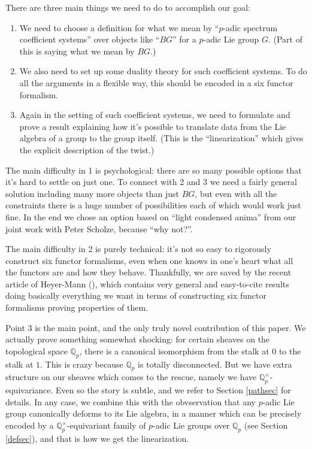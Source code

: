 \documentclass[12pt]{article}
\newcommand{\mbb}{\mathbb}
\begin{document}
There are three main things we need to do to accomplish our goal:

\begin{enumerate}
\item We need to choose a definition for what we mean by ``$p$-adic spectrum coefficient systems'' over objects like ``$BG$'' for a $p$-adic Lie group $G$.  (Part of this is saying what we mean by $BG$.)
\item We also need to set up some duality theory for such coefficient systems.  To do all the arguments in a flexible way, this should be encoded in a six functor formalism.
\item Again in the setting of such coefficient systems, we need to formulate and prove a result explaining how it's possible to translate data from the Lie algebra of a group to the group itself. (This is the ``linearization'' which gives the explicit description of the twist.)
\end{enumerate}

The main difficulty in 1 is psychological: there are so many possible options that it's hard to settle on just one.  To connect with 2 and 3 we need a fairly general solution including many more objects than just $BG$, but even with all the constraints there is a huge number of possibilities each of which would work just fine.  In the end we chose an option based on ``light condensed anima'' from our joint work with Peter Scholze, because ``why not?''.

The main difficulty in 2 is purely technical: it's not so easy to rigorously construct six functor formalisms, even when one knows in one's heart what all the functors are and how they behave.  Thankfully, we are saved by the recent article of Heyer-Mann (\cite{HeyerSixFunctors}), which contains very general and easy-to-cite results doing basically everything we want in terms of constructing six functor formalisms proving properties of them.

Point 3 is the main point, and the only truly novel contribution of this paper.  We actually prove something somewhat shocking: for certain sheaves on the topological space $\mathbb{Q}_p$, there is a canonical isomorphism from the stalk at $0$ to the stalk at $1$.  This is crazy because $\mathbb{Q}_p$ is totally disconnected.  But we have extra structure on our sheaves which comes to the rescue, namely we have $\mathbb{Q}_p^\times$-equivariance.  Even so the story is subtle, and we refer to Section \ref{pathsec} for details.  In any case, we combine this with the obvservation that any $p$-adic Lie group canonically deforms to its Lie algebra, in a manner which can be precisely encoded by a $\mbb{Q}_p^\times$-equivariant family of $p$-adic Lie groups over $\mbb{Q}_p$ (see Section \ref{defsec}), and that is how we get the linearization.
\end{document}
